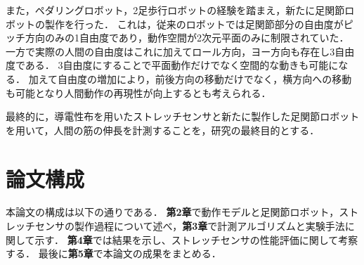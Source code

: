 また，ペダリングロボット，2足歩行ロボットの経験を踏まえ，新たに足関節ロボットの製作を行った．
これは，従来のロボットでは足関節部分の自由度がピッチ方向のみの1自由度であり，動作空間が2次元平面のみに制限されていた．
一方で実際の人間の自由度はこれに加えてロール方向，ヨー方向も存在し3自由度である．
3自由度にすることで平面動作だけでなく空間的な動きも可能になる．
加えて自由度の増加により，前後方向の移動だけでなく，横方向への移動も可能となり人間動作の再現性が向上するとも考えられる．

最終的に，導電性布を用いたストレッチセンサと新たに製作した足関節ロボットを用いて，人間の筋の伸長を計測することを，研究の最終目的とする．

\section{論文構成}
本論文の構成は以下の通りである．
{\bf 第2章}で動作モデルと足関節ロボット，ストレッチセンサの製作過程について述べ，{\bf 第3章}で計測アルゴリズムと実験手法に関して示す．
{\bf 第4章}では結果を示し、ストレッチセンサの性能評価に関して考察する．
最後に{\bf 第5章}で本論文の成果をまとめる．
